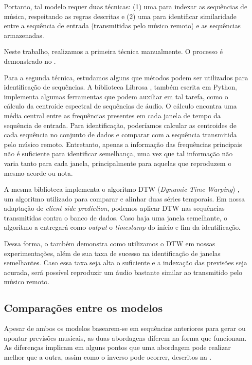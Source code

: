 Portanto, tal modelo requer duas técnicas: (1) uma para indexar as sequências de música, respeitando as regras descritas e (2) uma para identificar similaridade entre a sequência de entrada (transmitidas pelo músico remoto) e as sequências armazenadas.

Neste trabalho, realizamos a primeira técnica manualmente. O processo é demonstrado no .

Para a segunda técnica, estudamos alguns que métodos podem ser utilizados para identificação de sequências. A biblioteca Librosa \cite{librosa}, também escrita em Python, implementa algumas ferramentas que podem auxiliar em tal tarefa, como o cálculo da centroide espectral \cite{centroid} de sequências de áudio. O cálculo encontra uma média central entre as frequências presentes em cada janela de tempo da sequência de entrada. Para identificação, poderíamos calcular as centroides de cada sequência no conjunto de dados e comparar com a sequência transmitida pelo músico remoto. Entretanto, apenas a informação das frequências principais não é suficiente para identificar semelhança, uma vez que tal informação não varia tanto para cada janela, principalmente para aquelas que reproduzem o mesmo acorde ou nota.

A mesma biblioteca implementa o algoritmo DTW (\textit{Dynamic Time Warping}) \cite{dtw}, um algoritmo utilizado para comparar e alinhar duas séries temporais. Em nossa adaptação de \textit{client-side prediction}, podemos aplicar DTW nas sequências transmitidas contra o banco de dados. Caso haja uma janela semelhante, o algoritmo a entregará como \textit{output} o \textit{timestamp} do início e fim da identificação.

Dessa forma, o  também demonstra como utilizamos o DTW em nossas experimentações, além de sua taxa de sucesso na identificação de janelas semelhantes. Caso essa taxa seja alta o suficiente e a indexação das previsões seja acurada, será possível reproduzir um áudio bastante similar ao transmitido pelo músico remoto.

\subsection{Comparações entre os modelos}

Apesar de ambos os modelos basearem-se em sequências anteriores para gerar ou apontar previsões musicais, as duas abordagens diferem na forma que funcionam. As diferenças implicam em alguns pontos que uma abordagem pode realizar melhor que a outra, assim como o inverso pode ocorrer, descritos na .

